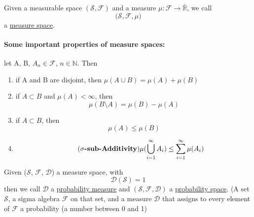 \documentclass[10pt,a4paper]{article}
\theoremstyle{definition}
\theoremstyle{plain}
\begin{document}
\begin{boxedsubdef}
	Given a measurable space $\mathcal{(S, F)}$ and a measure $\mu: \mathcal{F} \rightarrow \bar{\mathbb{R}}$, we call
	$$\mathcal{(S, F,} \mu)$$
	a \underline{measure space}.
\end{boxedsubdef}

\paragraph{Some important properties of measure spaces:} let A, B, $A_n \in \mathcal{F}$, $n \in \mathbb{N}$. Then
\begin{enumerate}
	\item if A and B are disjoint, then $\mu(A \cup B) = \mu(A) + \mu(B)$
	\item if $A \subset B$ and $\mu(A) < \infty$, then
	$$ \mu(B\setminus A) = \mu(B)-\mu(A)$$
	\item if $A \subset B$, then
	 $$\mu(A) \leq \mu(B)$$
	\item \begin{equation}
		\tag{\textbf{$\sigma\text{-sub-Additivity}$}}
		\mu (\bigcup_{i = 1}^{\infty} A_i) \leq \sum_{i = 1}^{\infty} \mu(A_i)
	\end{equation}
\end{enumerate}

\begin{boxeddef}
	Given ($\mathcal{S}$, $\mathcal{F}$, $\mathcal{D}$) a measure space, with 
	$$\mathcal{D}(\mathcal{S}) = 1$$
	then we call $\mathcal{D}$ a \underline{probability measure} and $\mathcal{(S, F, D)}$ a \underline{probability space}.
	(A set $\mathcal{S}$, a sigma algebra $\mathcal{F}$ on that set, and a measure $\mathcal{D}$ that assigns to every element of $\mathcal{F}$ a probability (a number between 0 and 1)
\end{boxeddef}
\end{document}
